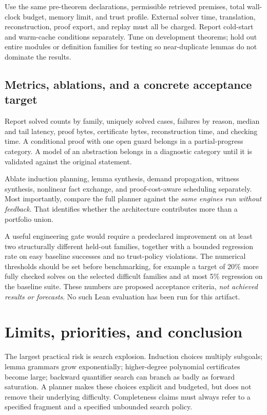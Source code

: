 \documentclass[11pt,a4paper]{article}
\begin{document}
Use the same pre-theorem declarations, permissible retrieved premises, total
wall-clock budget, memory limit, and trust profile. External solver time,
translation, reconstruction, proof export, and replay must all be charged.
Report cold-start and warm-cache conditions separately. Tune on development
theorems; hold out entire modules or definition families for testing so near-duplicate
lemmas do not dominate the results.

\subsection{Metrics, ablations, and a concrete acceptance target}
Report solved counts by family, uniquely solved cases, failures by reason,
median and tail latency, proof bytes, certificate bytes, reconstruction time,
and checking time. A conditional proof with one open guard belongs in a
partial-progress category. A model of an abstraction belongs in a diagnostic
category until it is validated against the original statement.

Ablate induction planning, lemma synthesis, demand propagation, witness
synthesis, nonlinear fact exchange, and proof-cost-aware scheduling separately.
Most importantly, compare the full planner against the \emph{same engines run
without feedback}. That identifies whether the architecture contributes more
than a portfolio union.

A useful engineering gate would require a predeclared improvement on at least
two structurally different held-out families, together with a bounded regression
rate on easy baseline successes and no trust-policy violations. The numerical
thresholds should be set before benchmarking, for example a target of 20\%
more fully checked solves on the selected difficult families and at most 5\%
regression on the baseline suite. These numbers are proposed acceptance
criteria, \emph{not achieved results or forecasts}. No such Lean evaluation has
been run for this artifact.

\section{Limits, priorities, and conclusion}
\label{sec:conclusion}
The largest practical risk is search explosion. Induction choices multiply
subgoals; lemma grammars grow exponentially; higher-degree polynomial
certificates become large; backward quantifier search can branch as badly as
forward saturation. A planner makes these choices explicit and budgeted, but
does not remove their underlying difficulty. Completeness claims must always
refer to a specified fragment and a specified unbounded search policy.
\end{document}
